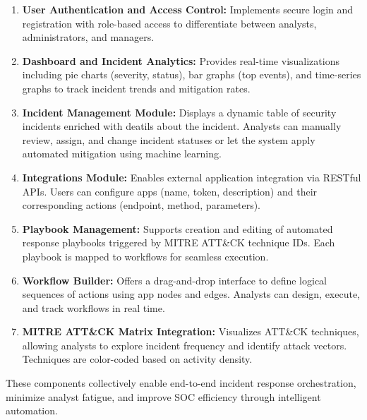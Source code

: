 \begin{enumerate}
    \item \textbf{User Authentication and Access Control:} 
    Implements secure login and registration with role-based access to differentiate between analysts, administrators, and managers.

    \item \textbf{Dashboard and Incident Analytics:} 
    Provides real-time visualizations including pie charts (severity, status), bar graphs (top events), and time-series graphs to track incident trends and mitigation rates.

    \item \textbf{Incident Management Module:} 
    Displays a dynamic table of security incidents enriched with deatils about the incident. Analysts can manually review, assign, and change incident statuses or let the system apply automated mitigation using machine learning.

    \item \textbf{Integrations Module:} 
    Enables external application integration via RESTful APIs. Users can configure apps (name, token, description) and their corresponding actions (endpoint, method, parameters).

    \item \textbf{Playbook Management:} 
    Supports creation and editing of automated response playbooks triggered by MITRE ATT\&CK technique IDs. Each playbook is mapped to workflows for seamless execution.

    \item \textbf{Workflow Builder:} 
    Offers a drag-and-drop interface to define logical sequences of actions using app nodes and edges. Analysts can design, execute, and track workflows in real time.

    \item \textbf{MITRE ATT\&CK Matrix Integration:} 
    Visualizes ATT\&CK techniques, allowing analysts to explore incident frequency and identify attack vectors. Techniques are color-coded based on activity density.

\end{enumerate}

These components collectively enable end-to-end incident response orchestration, minimize analyst fatigue, and improve SOC efficiency through intelligent automation.
